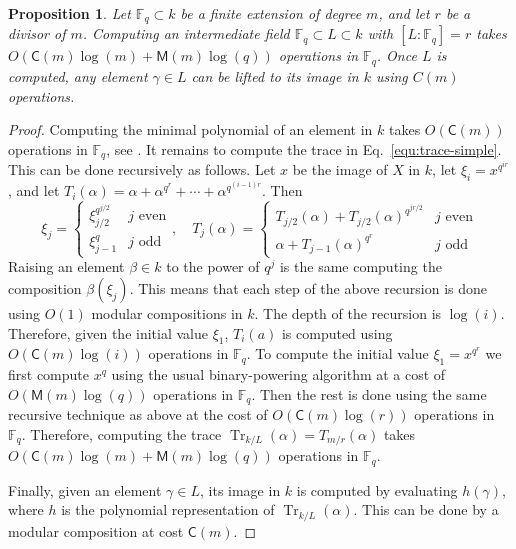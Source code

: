 \documentclass[12pt]{article}
\theoremstyle{plain}
\newtheorem{proposition}[theorem]{Proposition}
\theoremstyle{definition}
\DeclareMathOperator{\trace}{Tr} %
\def\F{\ensuremath{\mathbb{F}}}
\def\MM{\ensuremath{\mathsf{M}}}
\def\CC{\ensuremath{\mathsf{C}}}
\newcounter{algorithm}
\begin{document}
\begin{proposition}
	\label{prop:subfield}
	Let $\F_q \subset k$ be a finite extension of degree $m$, and
        let $r$ be a divisor of $m$.  Computing an intermediate field
        $\F_q \subset L \subset k$ with $[L:\F_q]=r$ takes
        $O(\CC(m)\log(m) + \MM(m)\log(q))$ operations in $\F_q$.  Once
        $L$ is computed, any element $\gamma\in L$ can be lifted to
        its image in $k$ using $C(m)$ operations.
\end{proposition}
\begin{proof}
	Computing the minimal polynomial of an element in $k$ takes $O(\CC(m))$ operations in $\F_q$, 
	see \cite{shoup93}. It remains to compute the trace in Eq.~\eqref{equ:trace-simple}. This can be done 
	recursively as follows. Let $x$ be the image of $X$ in $k$,
        let $\xi_i = x^{q^{ir}}$, and let $T_i(\alpha) = \alpha + \alpha^{q^r} + \cdots + \alpha^{q^{(i - 1)r}}$. Then
	\[
	\xi_j = 
	\begin{cases}
	\xi_{j / 2}^{q^{j / 2}} & j \text{ even} \\
	\xi_{j - 1}^q & j \text{ odd}
	\end{cases}, \quad
	T_j(\alpha) = 
	\begin{cases}
	T_{j / 2}(\alpha) + T_{j / 2}(\alpha)^{q^{jr/2}} & j \text{ even} \\
	\alpha + T_{j - 1}(\alpha)^{q^r} & j \text{ odd}
	\end{cases}
	\]
	Raising an element $\beta \in k$ to the power of $q^j$ is the same computing the composition 
	$\beta(\xi_j)$. This means that each step of the above recursion is done using $O(1)$ modular 
	compositions in $k$. The depth of the recursion is $\log(i)$. Therefore, given the initial value 
	$\xi_1$, $T_i(a)$ is computed using $O(\CC(m)\log(i))$ operations in $\F_q$. To compute the 
	initial value $\xi_1 = x^{q^r}$ we first compute $x^q$ using the usual binary-powering 
	algorithm at a cost of $O(\MM(m)\log(q))$ operations in $\F_q$. Then the rest is done using the 
	same recursive technique as above at the cost of $O(\CC(m)\log(r))$ operations in $\F_q$. 
	Therefore, computing the trace $\trace_{k/L}(\alpha) = T_{m/r}(\alpha)$ takes $O(\CC(m)\log(m) + 
	\MM(m)\log(q))$ operations in $\F_q$.

        Finally, given an element $\gamma\in L$, its image in $k$ is
        computed by evaluating $h(\gamma)$, where $h$ is the
        polynomial representation of $\trace_{k/L}(\alpha)$. This can
        be done by a modular composition at cost $\CC(m)$.
\end{proof}
\end{document}
